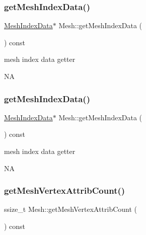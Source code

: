 \subsubsection{\texorpdfstring{get\+Mesh\+Index\+Data()}{getMeshIndexData()}\hspace{0.1cm}{\footnotesize\ttfamily [1/2]}}
{\footnotesize\ttfamily \hyperlink{classMeshIndexData}{Mesh\+Index\+Data}$\ast$ Mesh\+::get\+Mesh\+Index\+Data (\begin{DoxyParamCaption}{ }\end{DoxyParamCaption}) const\hspace{0.3cm}{\ttfamily [inline]}}

mesh index data getter

NA \mbox{\label{classMesh_abbe2d7d3d9cbefc55576375fdca32ecd}} 
\subsubsection{\texorpdfstring{get\+Mesh\+Index\+Data()}{getMeshIndexData()}\hspace{0.1cm}{\footnotesize\ttfamily [2/2]}}
{\footnotesize\ttfamily \hyperlink{classMeshIndexData}{Mesh\+Index\+Data}$\ast$ Mesh\+::get\+Mesh\+Index\+Data (\begin{DoxyParamCaption}{ }\end{DoxyParamCaption}) const\hspace{0.3cm}{\ttfamily [inline]}}

mesh index data getter

NA \mbox{\label{classMesh_afc2d755d1c586b16983e951d1c0af38b}} 
\subsubsection{\texorpdfstring{get\+Mesh\+Vertex\+Attrib\+Count()}{getMeshVertexAttribCount()}\hspace{0.1cm}{\footnotesize\ttfamily [1/2]}}
{\footnotesize\ttfamily ssize\+\_\+t Mesh\+::get\+Mesh\+Vertex\+Attrib\+Count (\begin{DoxyParamCaption}{ }\end{DoxyParamCaption}) const}

